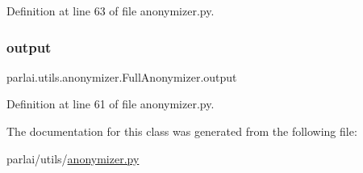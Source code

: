 Definition at line 63 of file anonymizer.\+py.

\mbox{\label{classparlai_1_1utils_1_1anonymizer_1_1FullAnonymizer_acf1b1219e757e42e5389a7dee4486c30}} 
\subsubsection{\texorpdfstring{output}{output}}
{\footnotesize\ttfamily parlai.\+utils.\+anonymizer.\+Full\+Anonymizer.\+output}



Definition at line 61 of file anonymizer.\+py.



The documentation for this class was generated from the following file\+:\begin{DoxyCompactItemize}
\item 
parlai/utils/\hyperlink{anonymizer_8py}{anonymizer.\+py}\end{DoxyCompactItemize}
